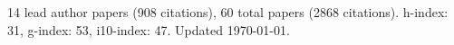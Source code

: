 14 lead author papers (908 citations),
60 total papers (2868 citations).\newline
h-index: 31, g-index: 53, i10-index: 47. Updated \today.